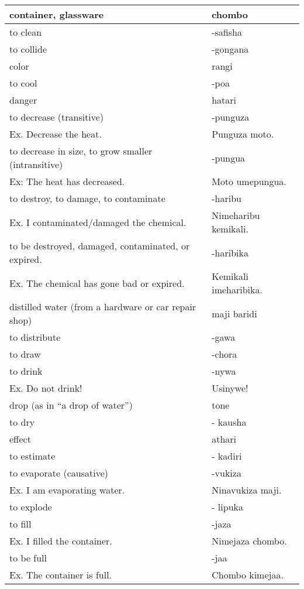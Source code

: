 \begin{center}
\begin{longtable}{|p{7cm}|p{7cm}|}
container, glassware	&	chombo	\\	\hline
to clean	&	-safisha	\\	\hline
to collide	&	-gongana	\\	\hline
color	&	rangi	\\	\hline
to cool	&	-poa	\\	\hline
danger	&	hatari	\\	\hline
to decrease (transitive)	&	-punguza	\\	
        Ex. Decrease the heat.	&	        Punguza moto.  	\\	\hline
to decrease in size, to grow smaller (intransitive)	&	-pungua	\\	
        Ex: The heat has decreased.	&	        Moto umepungua.	\\	\hline
to destroy, to damage, to contaminate	&	-haribu	\\	
        Ex. I contaminated/damaged the chemical.	&	        Nimeharibu kemikali.	\\	\hline
to be destroyed, damaged, contaminated, or expired.	&	-haribika	\\	
        Ex. The chemical has gone bad or expired.	&	        Kemikali imeharibika.	\\	\hline
distilled water (from a hardware or car repair shop) 	&	maji baridi	\\	\hline
to distribute	&	-gawa	\\	\hline
to draw	&	-chora	\\	\hline
to drink	&	-nywa	\\	
        Ex. Do not drink!	&	        Usinywe!	\\	\hline
drop (as in “a drop of water”)	&	tone 	\\	\hline
to dry	&	- kausha	\\	\hline
effect	&	athari	\\	\hline
to estimate	&	- kadiri	\\	\hline
to evaporate (causative)	&	-vukiza 	\\	
        Ex. I am evaporating water. 	&	        Ninavukiza maji.	\\	\hline
to explode	&	- lipuka	\\	\hline
to fill	&	-jaza	\\	
        Ex. I filled the container.	&	        Nimejaza chombo.	\\	\hline
to be full	&	-jaa	\\	
        Ex. The container is full.	&	        Chombo kimejaa. 	\\	\hline

\end{longtable}
\end{center}
